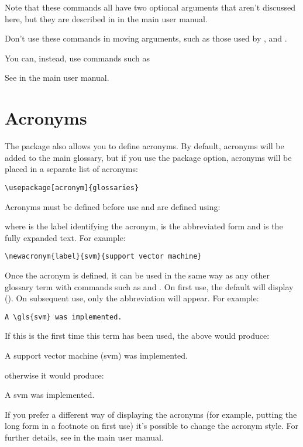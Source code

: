 \documentclass{nlctdoc}
\begin{document}
Note that these commands all have two optional arguments that aren't
discussed here, but they are described in
 in the main  user manual.

\begin{important}
Don't use these commands in moving arguments, such
as those used by ,  and .
\end{important}
You can, instead, use commands such as
\begin{definition}
\end{definition}
See  in the main  user manual.

\section{Acronyms}
\label{acronyms}

The  package also allows you to define acronyms.
By default, acronyms will be added to the main glossary, but if
you use the  package option, acronyms will be
placed in a separate list of acronyms:
\begin{verbatim}
\usepackage[acronym]{glossaries}
\end{verbatim}

Acronyms must be defined before use and are defined using:
\begin{definition}
\end{definition}
where  is the label identifying the acronym, 
is the abbreviated form and  is the fully expanded text.
For example:
\begin{verbatim}
\newacronym{label}{svm}{support vector machine}
\end{verbatim}

Once the acronym is defined, it can be used in the same way as 
any other glossary term with commands such as  and
. On first use, the default will display 
(). On subsequent use, only the abbreviation will
appear. For example:
\begin{verbatim}
A \gls{svm} was implemented.
\end{verbatim}
If this is the first time this term has been used, the above would 
produce:
\begin{display}
A support vector machine (svm) was implemented.
\end{display}
otherwise it would produce:
\begin{display}
A svm was implemented.
\end{display}
If you prefer a different way of displaying the acronyms (for
example, putting the long form in a footnote on first use) it's
possible to change the acronym style. For further
details, see 
in the main  user manual.
\end{document}
